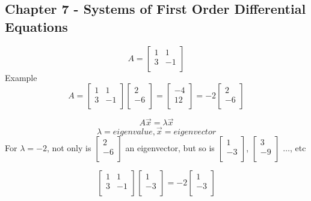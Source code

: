 \documentclass[12pt, letterpaper, twoside]{article}
\begin{document}
      \subsection*{Chapter 7 - Systems of First Order Differential Equations}
        \[
        A = 
		\begin{bmatrix}
		  1 & 1\\
		  3 & -1\\
		\end{bmatrix}
		\]
		Example
		\[
        A = 
		\begin{bmatrix}
		  1 & 1\\
		  3 & -1\\
		\end{bmatrix}
		\begin{bmatrix}
		  2\\
		  -6\\
		\end{bmatrix}
		=
		\begin{bmatrix}
		  -4\\
		  12\\
		\end{bmatrix}
		= -2
		\begin{bmatrix}
		  2\\
		  -6\\
		\end{bmatrix}
		\]
		
		$$A \vec{x} = \lambda \vec{x}$$
		$$\lambda = eigenvalue, \vec{x} = eigenvector$$
		For $\lambda = -2$, not only is 
		$\begin{bmatrix}
		  2\\
		  -6\\
		\end{bmatrix}$
		an eigenvector, but so is 
		$\begin{bmatrix}
		  1\\
		  -3\\
		\end{bmatrix}$, 
		$\begin{bmatrix}
		  3\\
		  -9\\
		\end{bmatrix}$
		$\dots$, etc
		
		\[
		\begin{bmatrix}
		  1 & 1\\
		  3 & -1\\
		\end{bmatrix}
		\begin{bmatrix}
		  1\\
		  -3\\
		\end{bmatrix}
		= -2
		\begin{bmatrix}
		  1\\
		  -3\\
		\end{bmatrix}
		\]
		
\end{document}
